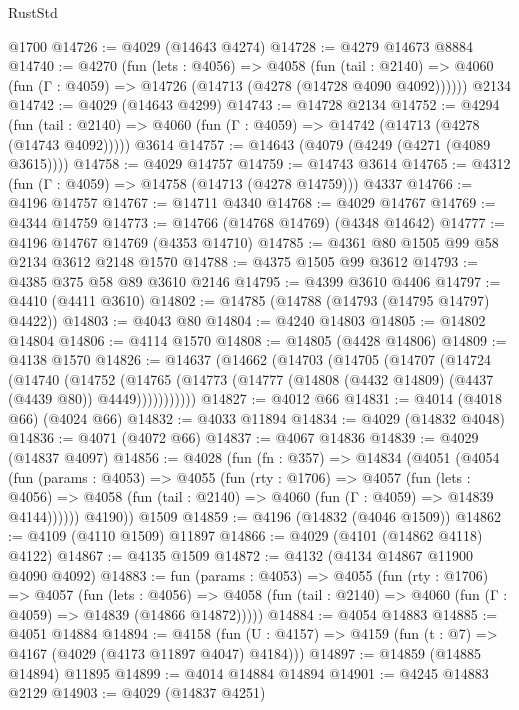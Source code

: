 \begin{lexlean}{RustStd}
\begin{coremodule}
    @1700
@14726 := @4029 (@14643 @4274)
@14728 := @4279 @14673 @8884
@14740 := @4270
    (fun (lets : @4056) =>
    @4058
      (fun (tail : @2140) =>
      @4060 (fun (Γ : @4059) => @14726 (@14713 (@4278 (@14728 @4090 @4092))))))
    @2134
@14742 := @4029 (@14643 @4299)
@14743 := @14728 @2134
@14752 := @4294
    (fun (tail : @2140) => @4060 (fun (Γ : @4059) => @14742 (@14713 (@4278 (@14743 @4092)))))
    @3614
@14757 := @14643 (@4079 (@4249 (@4271 (@4089 @3615))))
@14758 := @4029 @14757
@14759 := @14743 @3614
@14765 := @4312 (fun (Γ : @4059) => @14758 (@14713 (@4278 @14759))) @4337
@14766 := @4196 @14757
@14767 := @14711 @4340
@14768 := @4029 @14767
@14769 := @4344 @14759
@14773 := @14766 (@14768 @14769) (@4348 @14642)
@14777 := @4196 @14767 @14769 (@4353 @14710)
@14785 := @4361 @80 @1505 @99 @58 @2134 @3612 @2148 @1570
@14788 := @4375 @1505 @99 @3612
@14793 := @4385 @375 @58 @89 @3610 @2146
@14795 := @4399 @3610 @4406
@14797 := @4410 (@4411 @3610)
@14802 := @14785 (@14788 (@14793 (@14795 @14797) @4422))
@14803 := @4043 @80
@14804 := @4240 @14803
@14805 := @14802 @14804
@14806 := @4114 @1570
@14808 := @14805 (@4428 @14806)
@14809 := @4138 @1570
@14826 := @14637
    (@14662
      (@14703
        (@14705
          (@14707
            (@14724
              (@14740
                (@14752
                  (@14765
                    (@14773 (@14777 (@14808 (@4432 @14809) (@4437 (@4439 @80)) @4449)))))))))))
@14827 := @4012 @66
@14831 := @4014 (@4018 @66) (@4024 @66)
@14832 := @4033 @11894
@14834 := @4029 (@14832 @4048)
@14836 := @4071 (@4072 @66)
@14837 := @4067 @14836
@14839 := @4029 (@14837 @4097)
@14856 := @4028
    (fun (fn : @357) =>
    @14834
      (@4051
        (@4054
          (fun (params : @4053) =>
          @4055
            (fun (rty : @1706) =>
            @4057
              (fun (lets : @4056) =>
              @4058 (fun (tail : @2140) => @4060 (fun (Γ : @4059) => @14839 @4144))))))
        @4190))
    @1509
@14859 := @4196 (@14832 (@4046 @1509))
@14862 := @4109 (@4110 @1509) @11897
@14866 := @4029 (@4101 (@14862 @4118) @4122)
@14867 := @4135 @1509
@14872 := @4132 (@4134 @14867 @11900 @4090 @4092)
@14883 := fun (params : @4053) =>
  @4055
    (fun (rty : @1706) =>
    @4057
      (fun (lets : @4056) =>
      @4058 (fun (tail : @2140) => @4060 (fun (Γ : @4059) => @14839 (@14866 @14872)))))
@14884 := @4054 @14883
@14885 := @4051 @14884
@14894 := @4158
    (fun (U : @4157) => @4159 (fun (t : @7) => @4167 (@4029 (@4173 @11897 @4047) @4184)))
@14897 := @14859 (@14885 @14894) @11895
@14899 := @4014 @14884 @14894
@14901 := @4245 @14883 @2129
@14903 := @4029 (@14837 @4251)

\end{coremodule}
\end{lexlean}
